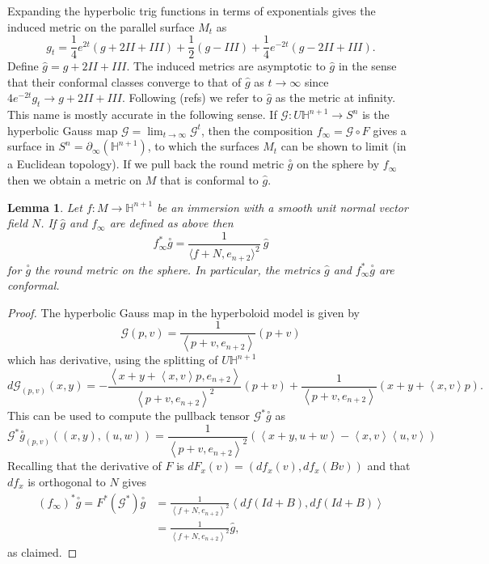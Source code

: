 \documentclass{amsart}
\newcommand{\two}{I\!\!I}
\newcommand{\three}{I\!\!I\!\!I}
\newtheorem{lem}[thm]{Lemma}
\renewcommand{\H}{\mathbb{H}}
\begin{document}
Expanding the hyperbolic trig functions in terms of exponentials gives the induced metric on the parallel surface $M_t$ as 
\[
g_t = \frac{1}{4}e^{2t}(g + 2\two + \three) + \frac{1}{2}(g - \three) + \frac{1}{4}e^{-2t}(g - 2\two + \three).
\]
Define $\hat{g} = g + 2\two + \three$.
The induced metrics are asymptotic to $\hat{g}$ in the sense that their conformal classes converge to that of $\hat{g}$ as $t \to \infty$ since $4e^{-2t}g_t \to g + 2\two + \three$.
Following (refs) we refer to $\hat{g}$ as the metric at infinity.
This name is mostly accurate in the following sense. 
If $\mathcal{G}: U\H^{n+1} \to S^n$ is the hyperbolic Gauss map $\mathcal{G} = \lim_{t \to \infty} \mathcal{G}^t$, then the composition $f_\infty = \mathcal{G} \circ F$ gives a
surface in $S^n = \partial_\infty(\H^{n+1})$, to which the surfaces $M_t$ can be shown to limit (in a Euclidean topology). 
If we pull back the round metric $\overset{\circ}{g}$ on the sphere by $f_\infty$ then we obtain a metric on $M$ that is conformal to $\hat{g}$. 

\begin{lem}
\label{HypGaussMap}
Let $f: M \to \H^{n+1}$ be an immersion with a smooth unit normal vector field $N$. If $\hat{g}$ and $f_\infty$ are defined as above then 
\[
f^*_\infty \overset{\circ}{g} = \frac{1}{\langle f + N, e_{n+2}\rangle^2} \ \hat{g}
\]
for $\overset{\circ}{g}$ the round metric on the sphere.
In particular, the metrics $\hat{g}$ and $f_\infty^*\overset{\circ}{g}$ are conformal.
\end{lem}

\begin{proof}
The hyperbolic Gauss map in the hyperboloid model is given by 
\[
\mathcal{G}(p,v) = \frac{1}{\left< p + v, e_{n+2} \right>} (p + v)
\]
which has derivative, using the splitting of $U\H^{n+1}$
\[
d\mathcal{G}_{(p,v)}(x,y) = 
-\frac{\left< x + y + \left<x,v\right>p, e_{n+2} \right>}{\left< p + v, e_{n+2} \right>^2}(p+v) + \frac{1}{\left< p + v, e_{n+2} \right>}(x + y + \left<x,v\right>p).
\]
This can be used to compute the pullback tensor $\mathcal{G}^*\overset{\circ}{g}$ as
\[
\mathcal{G}^*\overset{\circ}{g}_{(p,v)}((x,y),(u,w))
= \frac{1}{\left< p+v, e_{n+2}\right>^2}\left( \left<x+y,u+w\right> - \left<x,v\right>\left<u,v\right>\right)
\]
Recalling that the derivative of $F$ is $dF_x(v) = (df_x(v),df_x(Bv))$ and that $df_x$ is orthogonal to $N$ gives 
\begin{align*}
(f_\infty)^*\overset{\circ}{g} = F^*(\mathcal{G}^*)\overset{\circ}{g}
&=\frac{1}{\left< f + N , e_{n+2}\right>^2} \left< df(Id + B),df(Id + B)\right> \\
&= \frac{1}{\left< f + N , e_{n+2}\right>^2} \hat{g},
\end{align*}
as claimed.
\end{proof}
\end{document}
